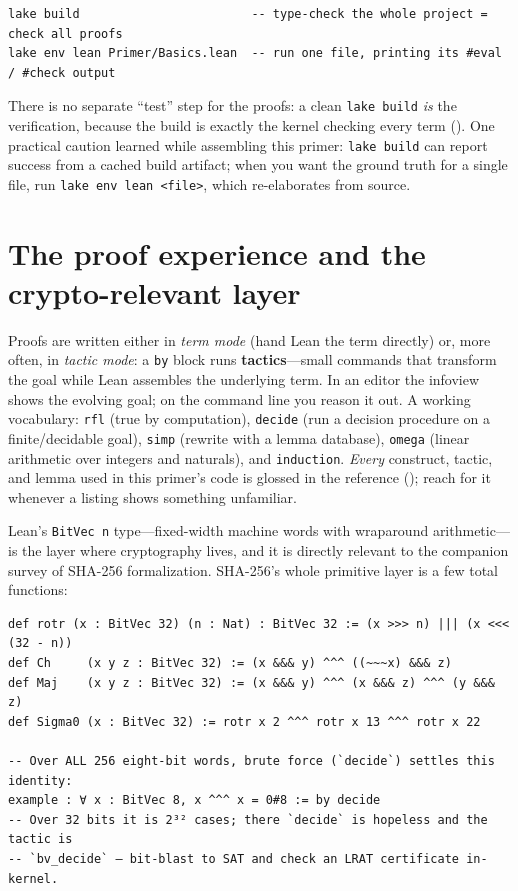 \documentclass[11pt]{article}
\newcommand{\code}[1]{\lstinline[basicstyle=\ttfamily]|#1|}
\begin{document}
\begin{lstlisting}
lake build                        -- type-check the whole project = check all proofs
lake env lean Primer/Basics.lean  -- run one file, printing its #eval / #check output
\end{lstlisting}

\noindent There is no separate ``test'' step for the proofs: a clean
\code{lake build} \emph{is} the verification, because the build is exactly the
kernel checking every term (). One practical caution learned
while assembling this primer: \code{lake build} can report success from a cached
build artifact; when you want the ground truth for a single file, run
\code{lake env lean <file>}, which re-elaborates from source.

\section{The proof experience and the crypto-relevant layer}\label{sec:proofs}
Proofs are written either in \emph{term mode} (hand Lean the term directly) or,
more often, in \emph{tactic mode}: a \code{by} block runs \textbf{tactics}---small
commands that transform the goal while Lean assembles the underlying term. In an
editor the infoview shows the evolving goal; on the command line you reason it
out. A working vocabulary: \code{rfl} (true by computation), \code{decide} (run a
decision procedure on a finite/decidable goal), \code{simp} (rewrite with a lemma
database), \code{omega} (linear arithmetic over integers and naturals), and
\code{induction}. \emph{Every} construct, tactic, and lemma used in this primer's
code is glossed in the reference (); reach for it whenever a
listing shows something unfamiliar.

Lean's \code{BitVec n} type---fixed-width machine words with wraparound
arithmetic---is the layer where cryptography lives, and it is directly relevant
to the companion survey of SHA-256 formalization. SHA-256's whole primitive layer
is a few total functions:

\begin{lstlisting}
def rotr (x : BitVec 32) (n : Nat) : BitVec 32 := (x >>> n) ||| (x <<< (32 - n))
def Ch     (x y z : BitVec 32) := (x &&& y) ^^^ ((~~~x) &&& z)
def Maj    (x y z : BitVec 32) := (x &&& y) ^^^ (x &&& z) ^^^ (y &&& z)
def Sigma0 (x : BitVec 32) := rotr x 2 ^^^ rotr x 13 ^^^ rotr x 22

-- Over ALL 256 eight-bit words, brute force (`decide`) settles this identity:
example : ∀ x : BitVec 8, x ^^^ x = 0#8 := by decide
-- Over 32 bits it is 2³² cases; there `decide` is hopeless and the tactic is
-- `bv_decide` — bit-blast to SAT and check an LRAT certificate in-kernel.
\end{lstlisting}
\end{document}
